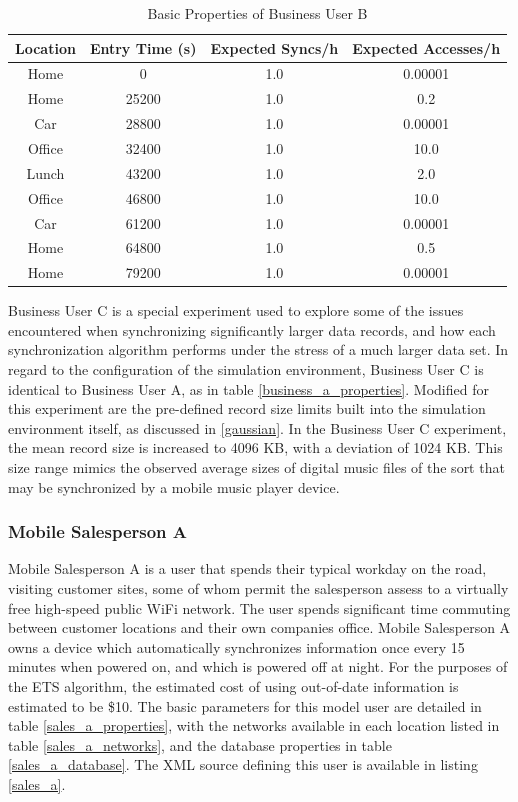 \begin{table}[htdp]
\begin{center}
\begin{tabular}{|c|c|c|c|}
\hline
\textbf{Location} & \textbf{Entry Time (s)} & \textbf{Expected Syncs/h} & \textbf{Expected Accesses/h} \\
\hline
Home & 0 & 1.0 & 0.00001 \\
\hline
Home & 25200 & 1.0 & 0.2 \\
\hline
Car & 28800 & 1.0 & 0.00001 \\
\hline
Office & 32400 & 1.0 & 10.0 \\
\hline
Lunch & 43200 & 1.0 & 2.0 \\
\hline
Office & 46800 & 1.0 & 10.0 \\
\hline
Car & 61200 & 1.0 & 0.00001 \\
\hline
Home & 64800 & 1.0 & 0.5 \\
\hline
Home & 79200 & 1.0 & 0.00001 \\
\hline
\end{tabular}
\end{center}
\caption{Basic Properties of Business User B}
\label{business_b_properties}
\end{table}

Business User C is a special experiment used to explore some of the issues encountered when synchronizing significantly larger data records, and how each synchronization algorithm performs under the stress of a much larger data set.  In regard to the configuration of the simulation environment, Business User C is identical to Business User A, as in table \ref{business_a_properties}.  Modified for this experiment are the pre-defined record size limits built into the simulation environment itself, as discussed in \ref{gaussian}.  In the Business User C experiment, the mean record size is increased to 4096 KB, with a deviation of 1024 KB.  This size range mimics the observed average sizes of digital music files of the sort that may be synchronized by a mobile music player device.

\subsubsection{Mobile Salesperson A}

Mobile Salesperson A is a user that spends their typical workday on the road, visiting customer sites, some of whom permit the salesperson assess to a virtually free high-speed public WiFi network.  The user spends significant time commuting between customer locations and their own companies office.  Mobile Salesperson A owns a device which automatically synchronizes information once every 15 minutes when powered on, and which is powered off at night.  For the purposes of the ETS algorithm, the estimated cost of using out-of-date information is estimated to be \$10.  The basic parameters for this model user are detailed in table \ref{sales_a_properties}, with the networks available in each location listed in table \ref{sales_a_networks}, and the database properties in table \ref{sales_a_database}.  The XML source defining this user is available in listing \ref{sales_a}.

